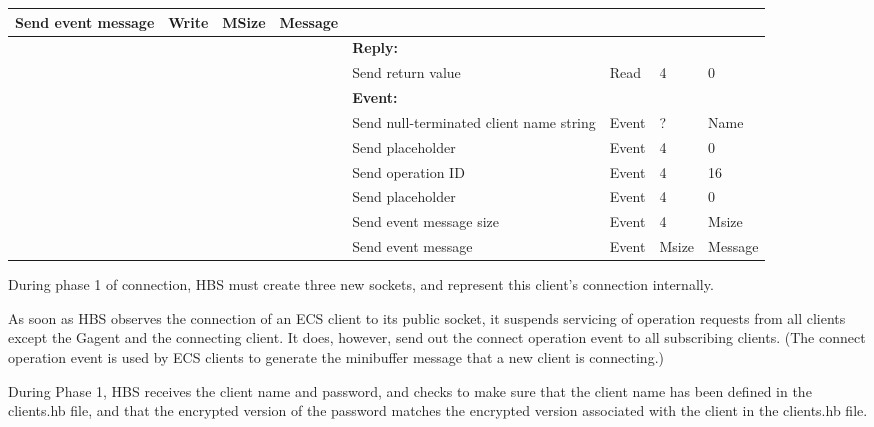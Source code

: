 \begin{tabular}{|p{1.2in}|p{.4in}|p{.4in}|p{.5in}|p{1.2in}|p{.4in}|p{.4in}|p{.5in} |}
Send event message
                  & Write  &  MSize &  Message &       &        &       &           \\  \hline
\multicolumn{4}{|l}{~}&\multicolumn{4}{|l|}{{\bf Reply:}} \\ \hline
                  &        &       &       & Send return
                                             value        & Read   &  4    & 0      \\ \hline
\multicolumn{4}{|l}{~}&\multicolumn{4}{|l|}{{\bf Event:}} \\ \hline
                  &        &       &       & Send null-terminated client
                                             name string  & Event  &  ?    & Name  \\ \hline
                  &        &       &       & Send placeholder  & Event  &   4   &  0    \\  \hline
                  &        &       &       & Send operation 
                                             ID           & Event  &   4   &  16   \\ \hline
                  &        &       &       & Send placeholder     & Event  &   4   &  0    \\ \hline
                  &        &       &       & Send event message
                                                  size    & Event  &   4   &  Msize \\ \hline
                  &        &       &       & Send event message
                                                          & Event  &  Msize&  Message  \\ \hline
\end{tabular}
\normalsize
\bigskip


During phase 1 of connection, HBS must create three new sockets, 
and represent this client's connection internally.

As soon as HBS observes the connection of an ECS client to its public
socket, it suspends servicing of operation requests from all clients except
the Gagent and the connecting client. It does, however, send out the
connect operation event to all subscribing clients. (The connect operation
event is used by ECS clients to generate the minibuffer message that a new
client is connecting.)

During Phase 1, HBS receives the client name and password, and checks
to make sure that the client name has been defined in the clients.hb
file, and that the encrypted version of the password matches the 
encrypted version associated with the client in the clients.hb file. 

